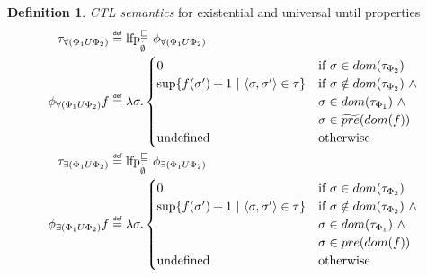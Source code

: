 \documentclass[11pt,a4paper,titlepage]{article}
\theoremstyle{definition}
\newtheorem{definition}{Definition}[section]
\newcommand\eqdef{\mathrel{\overset{\makebox[0pt]{\mbox{\normalfont\tiny\sffamily def}}}{=}}}
\begin{document}
\begin{definition}\label{def:ctl_semantics_until}
    \textit{CTL semantics} for existential and universal \textsf{until} properties
    \setlength{\jot}{15pt}
    \begin{align}
        \tau_{\forall(\Phi_1 U \Phi_2)}  &\eqdef \text{lfp}_{\overset{.}{\emptyset}}^{\sqsubseteq} \ \phi_{\forall(\Phi_1 U \Phi_2)}\\
        \phi_{\forall(\Phi_1 U \Phi_2)}f &\eqdef \lambda \sigma.
        \begin{cases}
            0                                                           
                & \text{if} \ \sigma \in dom(\tau_{\Phi_2}) \\
            \sup\{ f(\sigma') + 1 \ | \ \langle \sigma,\sigma' \rangle \in \tau \}    
                & \text{if} \ \sigma \notin dom(\tau_{\Phi_2}) \ \land \\ 
                & \sigma \in dom(\tau_{\Phi_1}) \ \land \\ 
                & \sigma \in \widetilde{pre}(dom(f)) \\
            \text{undefined}                                            
                & \text{otherwise}
        \end{cases}\\
        \tau_{\exists(\Phi_1 U \Phi_2)}  &\eqdef \text{lfp}_{\overset{.}{\emptyset}}^{\sqsubseteq} \ \phi_{\exists(\Phi_1 U \Phi_2)}\\
        \phi_{\exists(\Phi_1 U \Phi_2)}f &\eqdef \lambda \sigma.
        \begin{cases}
            0                                                           
                & \text{if} \ \sigma \in dom(\tau_{\Phi_2}) \\
            \sup\{ f(\sigma') + 1 \ | \ \langle \sigma,\sigma' \rangle \in \tau \}    
                & \text{if} \ \sigma \notin dom(\tau_{\Phi_2}) \ \land \\ 
                & \sigma \in dom(\tau_{\Phi_1}) \ \land \\ 
                & \sigma \in pre(dom(f)) \\
            \text{undefined}                                            
                & \text{otherwise}
        \end{cases}
    \end{align}
\end{definition}
\end{document}

